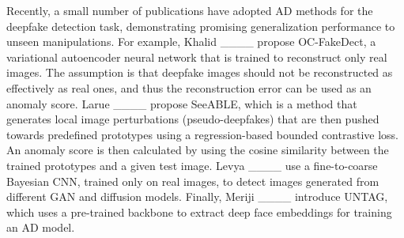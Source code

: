 Recently, a small number of publications have adopted AD methods for the deepfake detection task, demonstrating promising generalization performance to unseen manipulations. For example, Khalid \etal ____ propose OC-FakeDect, a variational autoencoder neural network that is trained to reconstruct only real images. The assumption is that deepfake images should not be reconstructed as effectively as real ones, and thus the reconstruction error can be used as an anomaly score. Larue \etal ____ propose  SeeABLE, which is a method that generates local image perturbations (pseudo-deepfakes) that are then pushed towards predefined prototypes using a regression-based bounded contrastive loss. An anomaly score is then calculated by using the cosine similarity between the trained prototypes and a given test image. Levya \etal ____ use a fine-to-coarse Bayesian CNN, trained only on real images, to detect images generated from different GAN and diffusion models. Finally, Meriji \etal ____ introduce UNTAG, which uses a pre-trained backbone to extract deep face embeddings for training an AD model.